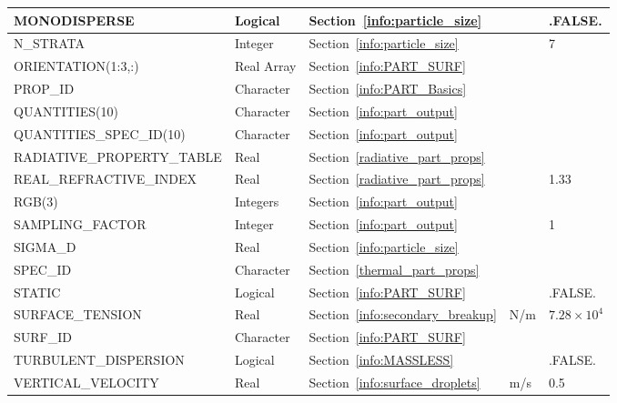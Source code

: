 \documentclass[11pt]{book}
\begin{document}
\begin{longtable}{@{\extracolsep{\fill}}|l|l|l|l|l|}
{\ct MONODISPERSE}                  & Logical         & Section~\ref{info:particle_size}        &           & {\ct .FALSE.} \\ \hline
{\ct N\_STRATA}                     & Integer         & Section~\ref{info:particle_size}        &           & 7             \\ \hline
{\ct ORIENTATION(1:3,:)}            & Real Array      & Section~\ref{info:PART_SURF}            &           &               \\ \hline
{\ct PROP\_ID}                      & Character       & Section~\ref{info:PART_Basics}          &           &               \\ \hline
{\ct QUANTITIES(10)}                & Character       & Section~\ref{info:part_output}          &           &               \\ \hline
{\ct QUANTITIES\_SPEC\_ID(10)}      & Character       & Section~\ref{info:part_output}          &           &               \\ \hline
{\ct RADIATIVE\_PROPERTY\_TABLE}    & Real            & Section~\ref{radiative_part_props}      &           &               \\ \hline
{\ct REAL\_REFRACTIVE\_INDEX}       & Real            & Section~\ref{radiative_part_props}      &           & 1.33          \\ \hline
{\ct RGB(3)}                        & Integers        & Section~\ref{info:part_output}          &           &               \\ \hline
{\ct SAMPLING\_FACTOR}              & Integer         & Section~\ref{info:part_output}          &           & 1             \\ \hline
{\ct SIGMA\_D}                      & Real            & Section~\ref{info:particle_size}        &           &               \\ \hline
{\ct SPEC\_ID}                      & Character       & Section~\ref{thermal_part_props}        &           &               \\ \hline
{\ct STATIC}                        & Logical         & Section~\ref{info:PART_SURF}            &           & {\ct .FALSE.} \\ \hline
{\ct SURFACE\_TENSION}              & Real            & Section~\ref{info:secondary_breakup}    &   N/m     & $7.28 \times 10^4$  \\ \hline
{\ct SURF\_ID}                      & Character       & Section~\ref{info:PART_SURF}            &           &               \\ \hline
{\ct TURBULENT\_DISPERSION}         & Logical         & Section~\ref{info:MASSLESS}             &           & {\ct .FALSE.} \\ \hline
{\ct VERTICAL\_VELOCITY}            & Real            & Section~\ref{info:surface_droplets}     & m/s       &  0.5          \\ \hline
\end{longtable}
\end{document}
